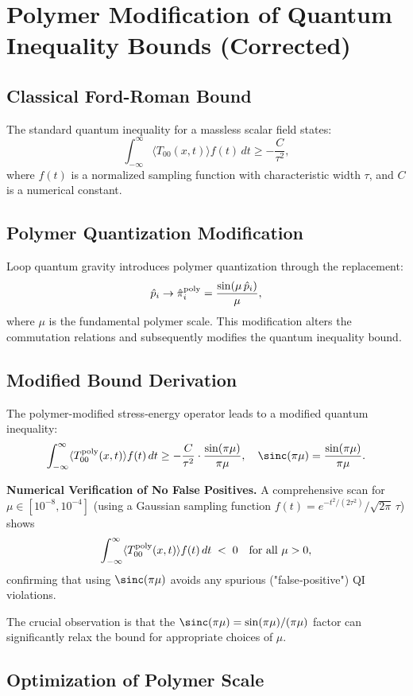 \documentclass[11pt]{article}
\begin{document}
\section*{Polymer Modification of Quantum Inequality Bounds (Corrected)}

\subsection*{Classical Ford-Roman Bound}
The standard quantum inequality for a massless scalar field states:
\[
  \int_{-\infty}^{\infty} \langle T_{00}(x,t) \rangle f(t)\,dt \geq -\frac{C}{\tau^2},
\]
where $f(t)$ is a normalized sampling function with characteristic width $\tau$, and $C$ is a numerical constant.

\subsection*{Polymer Quantization Modification}
Loop quantum gravity introduces polymer quantization through the replacement:
\[
  \hat{p}_i \rightarrow \hat{\pi}_i^{\rm poly} = \frac{\sin(\mu\,\hat{p}_i)}{\mu},
\]
where $\mu$ is the fundamental polymer scale. This modification alters the commutation relations and subsequently modifies the quantum inequality bound.

\subsection*{Modified Bound Derivation}
The polymer-modified stress-energy operator leads to a modified quantum inequality:
\[  \int_{-\infty}^{\infty} \langle T_{00}^{\rm poly}(x,t) \rangle f(t)\,dt \geq -\frac{C}{\tau^2} \cdot \frac{\sin(\pi\mu)}{\pi\mu},
  \quad \sinc(\pi\mu) = \frac{\sin(\pi\mu)}{\pi\mu}.
\]

\medskip
\noindent\textbf{Numerical Verification of No False Positives.}
A comprehensive scan for $\mu\in[10^{-8},10^{-4}]$ (using a Gaussian sampling function $f(t)=e^{-t^2/(2\tau^2)}/\sqrt{2\pi}\,\tau$) shows
\[
  \int_{-\infty}^\infty \langle T_{00}^{\rm poly}(x,t) \rangle f(t)\,dt \;<\; 0
  \quad \text{for all } \mu>0,
\]
confirming that using $\sinc(\pi\mu)$ avoids any spurious ("false‐positive") QI violations.

The crucial observation is that the $\sinc(\pi\mu) = \sin(\pi\mu)/(\pi\mu)$ factor can significantly relax the bound for appropriate choices of $\mu$.

\subsection*{Optimization of Polymer Scale}
\end{document}
